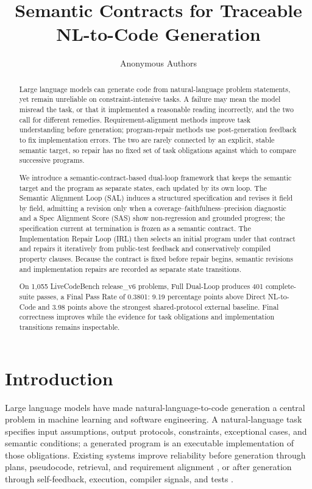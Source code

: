 \documentclass{article}
\title{Semantic Contracts for Traceable NL-to-Code Generation}
\author{Anonymous Authors}
\begin{document}
\maketitle

\begin{abstract}
Large language models can generate code from natural-language problem statements, yet remain unreliable on constraint-intensive tasks. A failure may mean the model misread the task, or that it implemented a reasonable reading incorrectly, and the two call for different remedies. Requirement-alignment methods improve task understanding before generation; program-repair methods use post-generation feedback to fix implementation errors. The two are rarely connected by an explicit, stable semantic target, so repair has no fixed set of task obligations against which to compare successive programs.

We introduce a semantic-contract-based dual-loop framework that keeps the semantic target and the program as separate states, each updated by its own loop. The Semantic Alignment Loop (SAL) induces a structured specification and revises it field by field, admitting a revision only when a coverage--faithfulness--precision diagnostic and a Spec Alignment Score (SAS) show non-regression and grounded progress; the specification current at termination is frozen as a semantic contract. The Implementation Repair Loop (IRL) then selects an initial program under that contract and repairs it iteratively from public-test feedback and conservatively compiled property clauses. Because the contract is fixed before repair begins, semantic revisions and implementation repairs are recorded as separate state transitions.

On 1,055 LiveCodeBench release\_v6 problems, Full Dual-Loop produces 401 complete-suite passes, a Final Pass Rate of 0.3801: 9.19 percentage points above Direct NL-to-Code and 3.98 points above the strongest shared-protocol external baseline. Final correctness improves while the evidence for task obligations and implementation transitions remains inspectable.
\end{abstract}

\section{Introduction}

Large language models have made natural-language-to-code generation a central problem in machine learning and software engineering. A natural-language task specifies input assumptions, output protocols, constraints, exceptional cases, and semantic conditions; a generated program is an executable implementation of those obligations. Existing systems improve reliability before generation through plans, pseudocode, retrieval, and requirement alignment \citep{ref_self_planning,ref_planning_driven_programming,ref_pseudocode_prompting,ref_codet,ref_acecoder,ref_mufix,ref_specfix,ref_reacoder}, or after generation through self-feedback, execution, compiler signals, and tests \citep{ref_self_refine,ref_reflexion,ref_opencodeinterpreter,ref_compiler_feedback,ref_stepcoder}.
\end{document}
